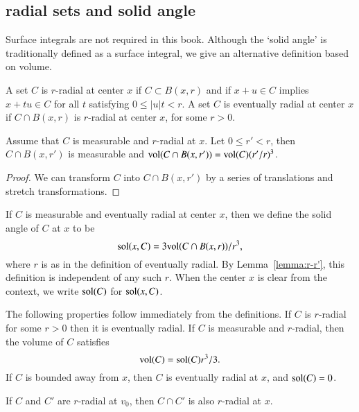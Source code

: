 \subsection{radial sets and solid angle}\label{sec:solid}


Surface integrals are not required in this book.  Although
the `solid angle' is traditionally defined as a surface integral,
we give an alternative definition based on volume.


\begin{definition}
    A set $C$ is $r$-radial at center $x$ if  $C\subset B(x,r)$
    and if
        $x + u \in C$ implies
        $x + t u \in C$ for all $t$ satisfying $0\le |u| t < r$.
A set $C$ is eventually radial at center $x$ if $C\cap B(x,r)$ is
$r$-radial at center $x$, for some $r>0$.
\end{definition}

\begin{lemma}
Assume that $C$ is measurable and $r$-radial at $x$.  Let $0\le r'<r$,
then $C\cap B(x,r')$ is measurable and
${\operatorname{vol}}(C\cap B(x,r')) = {\operatorname{vol}}(C) (r'/r)^3$.
\end{lemma}

\begin{proof}  We can transform $C$ into $C\cap B(x,r')$ by
a series of translations and stretch transformations.
\end{proof}


\begin{definition}
If $C$ is measurable and eventually radial at center $x$, then we
define the solid angle of $C$ at $x$ to be
    $$
    {\operatorname{sol}}(x,C) = 3 {\operatorname{vol}}(C\cap B(x,r))/r^3,
    $$
where $r$ is as in the definition of eventually radial. 
By Lemma~\ref{lemma:r-r'}, this
definition is independent of any such $r$.  When the center $x$ is
clear from the context, we write ${\operatorname{sol}}(C)$ for
${\operatorname{sol}}(x,C)$.
\end{definition}



The following properties follow immediately from the definitions.
If $C$ is $r$-radial for some $r>0$ then it is eventually radial.
If $C$ is measurable and $r$-radial, then the volume of $C$
satisfies
    $$
    {\operatorname{vol}}(C) = {\operatorname{sol}}(C) r^3/3.
    $$
If $C$ is bounded away from $x$, then $C$ is eventually radial at
$x$, and ${\operatorname{sol}}(C) = 0$.

\begin{lemma}  If $C$ and $C'$ are  $r$-radial
at $v_0$, then $C\cap C'$ is also $r$-radial at
$x$.
\end{lemma}






